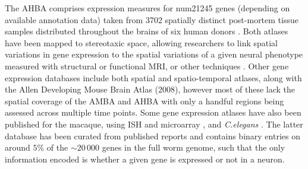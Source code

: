 The AHBA comprises expression measures for num{21245} genes (depending on available annotation data) taken from 3702 spatially distinct post-mortem tissue samples distributed throughout the brains of six human donors \citep{Hawrylycz2012,Hawrylycz2015}.
Both atlases have been mapped to stereotaxic space, allowing researchers to link spatial variations in gene expression to the spatial variations of a given neural phenotype measured with structural or functional MRI, or other techniques \citep{Furth2018}.
Other gene expression databases include both spatial \citep{Fertuzinhos2014} and spatio-temporal \citep{Ayoub2011,Belgard2011,Colantuoni2011,Miller2014} atlases, along with the Allen Developing Mouse Brain Atlas (2008), however most of these lack the spatial coverage of the AMBA and AHBA with only a handful regions being assessed across multiple time points. Some gene expression atlases have also been published for the macaque, using ISH and microarray \citep{Bakken2016}, and \textit{C.elegans} \citep{Harris2010}.
The latter database has been curated from published reports and contains binary entries on around $5$\% of the $\sim20\,000$ genes in the full worm genome, such that the only information encoded is whether a given gene is expressed or not in a neuron.

